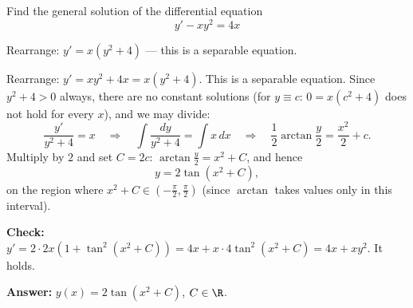 
\begin{question}
Find the general solution of the differential equation
\[ y' - xy^2 = 4x \]
\end{question}

\begin{hint}
Rearrange: $y' = x(y^2 + 4)$ --- this is a separable equation.
\end{hint}

\begin{solution}
Rearrange: $y' = xy^2 + 4x = x(y^2 + 4)$. This is a separable equation. Since $y^2 + 4 > 0$ always, there are no constant solutions (for $y\equiv c$: $0 = x(c^2+4)$ does not hold for every $x$), and we may divide:
\[ \frac{y'}{y^2 + 4} = x \quad\Longrightarrow\quad \int\frac{dy}{y^2 + 4} = \int x\,dx \quad\Longrightarrow\quad \frac12\arctan\frac y2 = \frac{x^2}{2} + c. \]
Multiply by $2$ and set $C = 2c$: $\arctan\frac y2 = x^2 + C$, and hence
\[ y = 2\tan\left(x^2 + C\right), \]
on the region where $x^2 + C \in (-\frac\pi2, \frac\pi2)$ (since $\arctan$ takes values only in this interval).

\textbf{Check:} $y' = 2\cdot 2x\left(1 + \tan^2(x^2 + C)\right) = 4x + x\cdot 4\tan^2(x^2+C) = 4x + xy^2$. It holds.

\textbf{Answer:} $y(x) = 2\tan(x^2 + C)$, $C \in \R$.
\end{solution}
